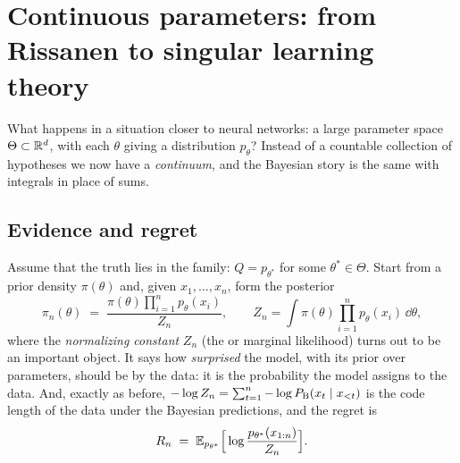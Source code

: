 
\section{Continuous parameters: from Rissanen to singular learning theory}\label{sec:L3-singular}
What happens in a situation closer to neural networks: a large parameter space $\Theta\subset\mathbb{R}^d$, with each $\theta$ giving a distribution $p_\theta$? Instead of a countable collection of hypotheses we now have a \emph{continuum}, and the Bayesian story is the same with integrals in place of sums.

\subsection{Evidence and regret}\label{sec:L3-evidence}
Assume that the truth lies in the family: $Q=p_{\theta^*}$ for some $\theta^*\in\Theta$. Start from a prior density $\pi(\theta)$ and, given $x_1,\dots,x_n$, form the posterior
\[
   \pi_n(\theta)\;=\;\frac{\pi(\theta)\prod_{i=1}^np_\theta(x_i)}{Z_n},\qquad Z_n=\int\pi(\theta)\prod_{i=1}^np_\theta(x_i)\,\dd\theta ,
\]
where the \emph{normalizing constant} $Z_n$ (the  or marginal likelihood) turns out to be an important object. It says how \emph{surprised} the model, with its prior over parameters, should be by the data: it is the probability the model assigns to the data. And, exactly as before,
$-\log Z_n=\sum_{t=1}^n-\log P_{\mathrm{B}}(x_t\mid x_{<t})$ is the code length of the data under the Bayesian predictions, and the regret is
\[
   R_n\;=\;\mathbb{E}_{p_{\theta^*}}\Big[\log\frac{p_{\theta^*}(x_{1:n})}{Z_n}\Big].
\]

